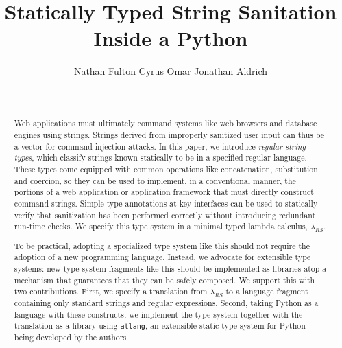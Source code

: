 \documentclass[9pt]{sig-alternate}
\theoremstyle{definition}
\begin{document}


\newcommand{\Ace}{\textsf{Ace}}

\title{Statically Typed String Sanitation Inside a Python}
\author{
  \alignauthor
  Nathan Fulton
  \alignauthor
  Cyrus Omar
  \alignauthor
  Jonathan Aldrich
  \and
  \\
}

\maketitle
\begin{abstract}
Web applications must ultimately command systems like web browsers and database engines using strings. Strings derived from improperly sanitized user input  can thus be a vector for command injection attacks. 
In this paper, we introduce \emph{regular string types}, which classify strings known statically to be in a specified regular language. These types come equipped with common operations like concatenation, substitution and coercion, so they  can be used to implement, in a conventional manner, the portions of a web application or application framework that must directly construct command strings. Simple type annotations at key interfaces can be used to statically verify that sanitization has been performed correctly without introducing redundant run-time checks. We specify this type system in a minimal typed lambda calculus, $\lambda_{RS}$.

To be practical, adopting a specialized type system like this should not require the adoption of a new programming language. Instead, we advocate for extensible type systems: new type system fragments like this should be implemented as libraries atop a mechanism that guarantees that they can be safely composed.  
We support this with two contributions. First, we specify a translation from $\lambda_{RS}$ to a language fragment containing only standard strings and regular expressions. Second, taking Python as a language with these constructs, we implement the type system together with the translation as a library using \texttt{atlang}, an extensible static type system for Python being developed by the authors.
\end{abstract}
\end{document}
